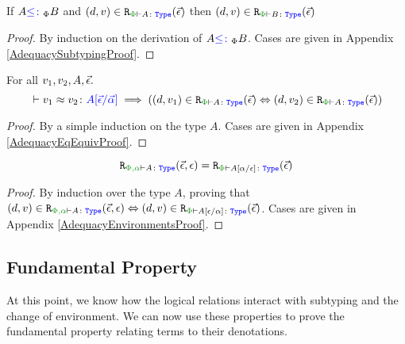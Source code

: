 \begin{framed}
    \begin{theorem}\label{LogRelSubtype}
        If $A{\color{blue} \leq\colon}_\Phi B$ and $\inLogRelPE{d}{v}{A}$ then $\inLogRelPE{d}{v}{B}$
    \end{theorem}
    
    \begin{proof}
        By induction on the derivation of $A{\color{blue} \leq\colon}_\Phi B$. Cases are given in Appendix \ref{AdequacySubtypingProof}.
    \end{proof}
\end{framed}

\begin{framed}
    \begin{theorem}\label{LogRelBeequiv}
        For all $v_1, v_2, A, \vec{\epsilon}.$
        \begin{equation}
            \zberelation{v_1}{v_2}{A\ssub{\av}{\ev}}\implies (\inLogRelPE{d}{v_1}{A} \Leftrightarrow \inLogRelPE{d}{v_2}{A})
        \end{equation}
        
    \end{theorem}
    
    \begin{proof}
        By a simple induction on the type $A$. Cases are given in Appendix \ref{AdequacyEqEquivProof}.
    \end{proof}
\end{framed}

\begin{framed}
    \begin{lemma}\label{EnvironmentLemma}
        $$\erelates{\P,\a}{A}(\ev, \e) = \erelates{\P}{A\ssub{\e}{\a}}(\ev)$$
    \end{lemma}
    
    \begin{proof}
        By induction over the type $A$, proving that $\inLogRel{d}{v}{\P,\a}{A}{\ev, \e} \Leftrightarrow \inLogRelPE{d}{v}{A\ssub{\a}{\e}}$. Cases are given in Appendix \ref{AdequacyEnvironmentsProof}.
    \end{proof}
\end{framed}




\subsection{Fundamental Property}\label{FundProp}
At this point, we know how the logical relations interact with subtyping and the change of environment. We can now use these properties to prove the fundamental property relating terms to their denotations.

